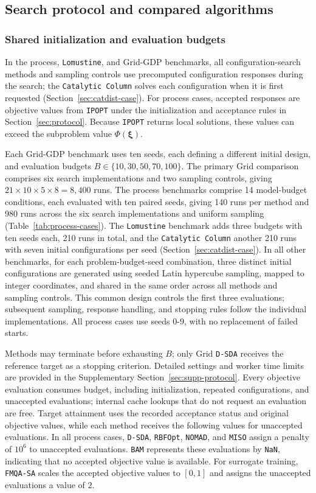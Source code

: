 \documentclass{article}
\begin{document}
\subsection{Search protocol and compared algorithms}

\subsubsection{Shared initialization and evaluation budgets}
In the process, \texttt{Lomustine}, and Grid-GDP benchmarks, all configuration-search methods and sampling controls use precomputed configuration responses during the search; the \texttt{Catalytic Column} solves each configuration when it is first requested (Section~\ref{sec:catdist-case}).
For process cases, accepted responses are objective values from \texttt{IPOPT} under the initialization and acceptance rules in Section~\ref{sec:protocol}.
Because \texttt{IPOPT} returns local solutions, these values can exceed the subproblem value \(\Phi(\boldsymbol\xi)\).

Each Grid-GDP benchmark uses ten seeds, each defining a different initial design, and evaluation budgets \(B\in\{10,30,50,70,100\}\).
The primary Grid comparison comprises six search implementations and two sampling controls, giving \(21\times10\times5\times8=8{,}400\) runs.
The process benchmarks comprise 14 model-budget conditions, each evaluated with ten paired seeds, giving 140 runs per method and 980 runs across the six search implementations and uniform sampling (Table~\ref{tab:process-cases}).
The \texttt{Lomustine} benchmark adds three budgets with ten seeds each, 210 runs in total, and the \texttt{Catalytic Column} another 210 runs with seven initial configurations per seed (Section~\ref{sec:catdist-case}).
In all other benchmarks, for each problem-budget-seed combination, three distinct initial configurations are generated using seeded Latin hypercube sampling, mapped to integer coordinates, and shared in the same order across all methods and sampling controls.
This common design controls the first three evaluations; subsequent sampling, response handling, and stopping rules follow the individual implementations.
All process cases use seeds 0-9, with no replacement of failed starts.

Methods may terminate before exhausting \(B\); only Grid \texttt{D-SDA} receives the reference target as a stopping criterion.
Detailed settings and worker time limits are provided in the Supplementary Section~\ref{sec:supp-protocol}.
Every objective evaluation consumes budget, including initialization, repeated configurations, and unaccepted evaluations; internal cache lookups that do not request an evaluation are free.
Target attainment uses the recorded acceptance status and original objective values, while each method receives the following values for unaccepted evaluations.
In all process cases, \texttt{D-SDA}, \texttt{RBFOpt}, \texttt{NOMAD}, and \texttt{MISO} assign a penalty of \(10^6\) to unaccepted evaluations.
\texttt{BAM} represents these evaluations by \texttt{NaN}, indicating that no accepted objective value is available.
For surrogate training, \texttt{FMQA-SA} scales the accepted objective values to \([0,1]\) and assigns the unaccepted evaluations a value of \(2\).
\end{document}
